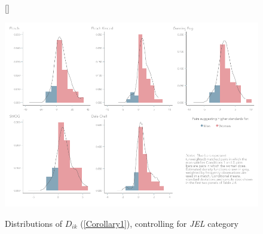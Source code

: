 \begin{figure}[H]
	
	[\FBwidth]
	{
		\caption{Distributions of \(D_{ik}\) (\autoref{Corollary1}), controlling for \textit{JEL} category}\label{figure8_jel}
	}
	{
		\includegraphics[width=12.3cm]{0-images/generated/Figure-5-jel.pdf}
	}
\end{figure}